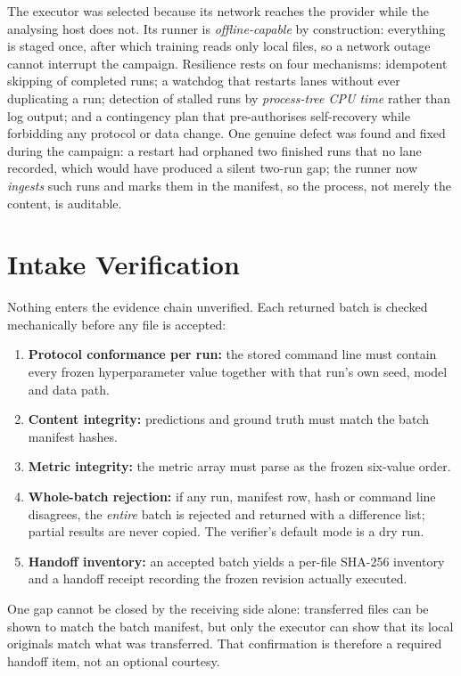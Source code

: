 \documentclass[conference]{IEEEtran}
\begin{document}
The executor was selected because its network reaches the provider while the analysing host does not.
Its runner is \emph{offline-capable} by construction: everything is staged once, after which training
reads only local files, so a network outage cannot interrupt the campaign. Resilience rests on four
mechanisms: idempotent skipping of completed runs; a watchdog that restarts lanes without ever
duplicating a run; detection of stalled runs by \emph{process-tree CPU time} rather than log output;
and a contingency plan that pre-authorises self-recovery while forbidding any protocol or data
change. One genuine defect was found and fixed during the campaign: a restart had orphaned two
finished runs that no lane recorded, which would have produced a silent two-run gap; the runner now
\emph{ingests} such runs and marks them in the manifest, so the process, not merely the content, is
auditable.

\section{Intake Verification}
\label{sec:verify}

Nothing enters the evidence chain unverified. Each returned batch is checked mechanically before any
file is accepted:
\begin{enumerate}
\item \textbf{Protocol conformance per run:} the stored command line must contain every frozen
hyperparameter value together with that run's own seed, model and data path.
\item \textbf{Content integrity:} predictions and ground truth must match the batch manifest hashes.
\item \textbf{Metric integrity:} the metric array must parse as the frozen six-value order.
\item \textbf{Whole-batch rejection:} if any run, manifest row, hash or command line disagrees, the
\emph{entire} batch is rejected and returned with a difference list; partial results are never
copied. The verifier's default mode is a dry run.
\item \textbf{Handoff inventory:} an accepted batch yields a per-file SHA-256 inventory and a handoff
receipt recording the frozen revision actually executed.
\end{enumerate}

One gap cannot be closed by the receiving side alone: transferred files can be shown to match the
batch manifest, but only the executor can show that its local originals match what was transferred.
That confirmation is therefore a required handoff item, not an optional courtesy.
\end{document}
